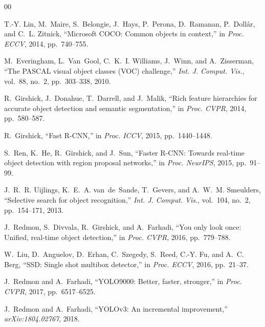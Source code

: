 \balance

\begin{thebibliography}{00}

T.-Y. Lin, M.~Maire, S.~Belongie, J.~Hays, P.~Perona, D.~Ramanan,
P.~Doll{\'a}r, and C.~L. Zitnick, ``Microsoft COCO: Common objects in
context,'' in \textit{Proc. ECCV}, 2014, pp.~740--755.

M.~Everingham, L.~Van~Gool, C.~K.~I. Williams, J.~Winn, and A.~Zisserman,
``The PASCAL visual object classes (VOC) challenge,''
\textit{Int. J. Comput. Vis.}, vol.~88, no.~2, pp.~303--338, 2010.

R.~Girshick, J.~Donahue, T.~Darrell, and J.~Malik, ``Rich feature hierarchies
for accurate object detection and semantic segmentation,'' in
\textit{Proc. CVPR}, 2014, pp.~580--587.

R.~Girshick, ``Fast R-CNN,'' in \textit{Proc. ICCV}, 2015,
pp.~1440--1448.

S.~Ren, K.~He, R.~Girshick, and J.~Sun, ``Faster R-CNN: Towards real-time
object detection with region proposal networks,''
in \textit{Proc. NeurIPS}, 2015, pp.~91--99.

J.~R.~R. Uijlings, K.~E.~A. van~de~Sande, T.~Gevers, and A.~W.~M. Smeulders,
``Selective search for object recognition,''
\textit{Int. J. Comput. Vis.}, vol.~104, no.~2, pp.~154--171, 2013.

J.~Redmon, S.~Divvala, R.~Girshick, and A.~Farhadi, ``You only look once:
Unified, real-time object detection,'' in \textit{Proc. CVPR}, 2016,
pp.~779--788.

W.~Liu, D.~Anguelov, D.~Erhan, C.~Szegedy, S.~Reed, C.-Y. Fu, and
A.~C. Berg, ``SSD: Single shot multibox detector,''
in \textit{Proc. ECCV}, 2016, pp.~21--37.

J.~Redmon and A.~Farhadi, ``YOLO9000: Better, faster, stronger,''
in \textit{Proc. CVPR}, 2017, pp.~6517--6525.

J.~Redmon and A.~Farhadi, ``YOLOv3: An incremental improvement,''
\textit{arXiv:1804.02767}, 2018.


\end{thebibliography}
